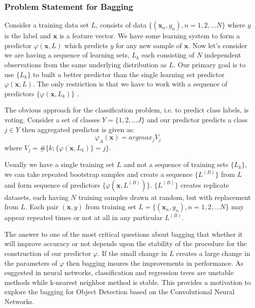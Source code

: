 \documentclass[conference]{IEEEtran}
\begin{document}
\subsubsection{Problem Statement for Bagging}
Consider a training data set $L$, consists of data $\{ (\textbf{x}_n, y_n), n = 1, 2, ... N \}$ where $y$ is the label and $\textbf{x}$ is a feature vector. We have some learning system to form a predictor $\varphi(\textbf{x}, L)$ which predicts $y$ for any new sample of $\textbf{x}$. Now let's consider we are having a sequence of learning sets, ${L_k}$ each consisting of $N$ independent observations from the same underlying distribution as $L$. Our primary goal is to use $\{L_k\}$ to built a better predictor than the single learning set predictor $\varphi(\textbf{x}, L)$. The only restriction is that we have to work with a sequence of predictors $\{\varphi(\textbf{x}, L_k)\}$ \cite{Breiman1996}.

The obvious approach for the classification problem, i.e. to predict class labels, is voting. Consider a set of classes $Y = \{ 1, 2, ... J\}$ and our predictor predicts a class $j \in Y$ then aggregated predictor is given as: $$\varphi_A(\textbf{x}) = argmax_j V_j$$ where $V_j = \#\{k; \{\varphi(\textbf{x}, L_k)\} = j \}$. 

Usually we have a single training set $L$ and not a sequence of training sets $\{L_k\}$, we can take repeated bootstrap samples and create a sequence $\{L^{(B)}\}$ from $L$ and form sequence of predictors $\{\varphi(\textbf{x}, L^{(B)})\}$. $\{L^{(B)}\}$ creates replicate datasets, each having $N$ training samples drawn at random, but with replacement from $L$. Each pair $(\textbf{x}, y)$ from training set $ L = \{ (\textbf{x}_n, y_n), n = 1, 2, ... N \}$ may appear repeated times or not at all in any particular $L^{(B)}$. 

The answer to one of the most critical questions about bagging that whether it will improve accuracy or not depends upon the stability of the procedure for the construction of our predictor $\varphi$. If the small change in $L$ creates a large change in the parameters of $\varphi$ then bagging insures the improvements in performance. As suggested in \cite{breiman1996heuristics} neural networks, classification and regression trees are unstable methods while k-nearest neighbor method is stable. This provides a motivation to explore the bagging for Object Detection based on the Convolutional Neural Networks. 
\end{document}
